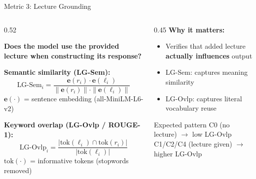 \documentclass[aspectratio=169]{beamer}
\begin{document}
\begin{frame}{Metric 3: Lecture Grounding}
\begin{columns}[T]
  \begin{column}{0.52\textwidth}
  
    \textbf{Does the model use the provided lecture when constructing its response?}

   
    \textbf{Semantic similarity (LG-Sem):}
    \[
      \text{LG-Sem}_i = \frac{\mathbf{e}(r_i)\cdot\mathbf{e}(\ell_i)}
                            {\|\mathbf{e}(r_i)\|\cdot\|\mathbf{e}(\ell_i)\|}
    \]
    \footnotesize $\mathbf{e}(\cdot)$ = sentence embedding (all-MiniLM-L6-v2)\normalsize

   
    \textbf{Keyword overlap (LG-Ovlp / ROUGE-1):}
    \[
      \text{LG-Ovlp}_i = \frac{|\text{tok}(\ell_i)\cap\text{tok}(r_i)|}{|\text{tok}(\ell_i)|}
    \]
    \footnotesize $\text{tok}(\cdot)$ = informative tokens (stopwords removed)\normalsize
  \end{column}
  \begin{column}{0.45\textwidth}
    \textbf{Why it matters:}
    \begin{itemize}\itemsep5pt
      \item Verifies that added lecture \textbf{actually influences} output
      \item LG-Sem: captures meaning similarity
      \item LG-Ovlp: captures literal vocabulary reuse
     
    \end{itemize}
    \vspace{0.2cm}
    \begin{alertblock}{Expected pattern}
      \small C0 (no lecture) $\to$ low LG-Ovlp\\
      C1/C2/C4 (lecture given) $\to$ higher LG-Ovlp
    \end{alertblock}
  \end{column}
\end{columns}
\end{frame}
\end{document}
